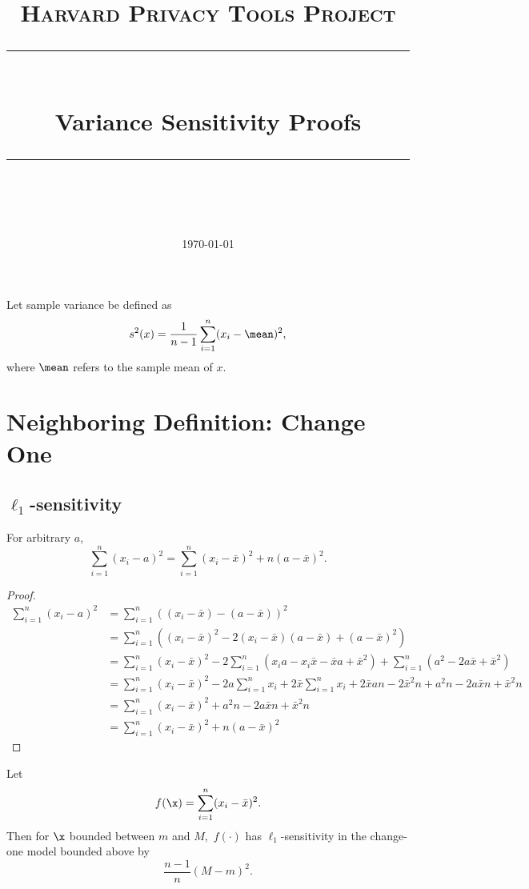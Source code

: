 \documentclass[11pt]{scrartcl} %
\title{
	\normalfont\normalsize
	\textsc{Harvard Privacy Tools Project}\\ %
	\vspace{25pt} %
	\rule{\linewidth}{0.5pt}\\ %
	\vspace{20pt} %
	{\huge Variance Sensitivity Proofs}\\ %
	\vspace{12pt} %
	\rule{\linewidth}{2pt}\\ %
	\vspace{12pt} %
}
\date{\normalsize\today} %
\begin{document}
\maketitle

\begin{definition}
Let sample variance be defined as
$$ s^2(x) = \frac{1}{n-1} \sum_{i=1}^n (x_i - \mean)^2,$$
where $\mean$ refers to the sample mean of $x$.
\end{definition}

\section{Neighboring Definition: Change One}
\subsection{$\ell_1$-sensitivity}
\begin{lemma}
\label{lemma:meansum}
For arbitrary $a$,
$$ \sum_{i=1}^n (x_i - a)^2 = \sum_{i=1}^n (x_i - \bar{x})^2 + n(a-\bar{x})^2.$$
\end{lemma}

\begin{proof}
\begin{align*}
\sum_{i=1}^n (x_i - a)^2 &= \sum_{i=1}^n \left( (x_i - \bar{x}) - (a-\bar{x}) \right)^2\\
	&= \sum_{i=1}^n \left( (x_i - \bar{x})^2 -2(x_i - \bar{x})(a-\bar{x}) + (a-\bar{x})^2\right)\\
	&= \sum_{i=1}^n (x_i - \bar{x})^2 - 2\sum_{i=1}^n \left(x_ia-x_i\bar{x} -\bar{x}a + \bar{x}^2\right) + \sum_{i=1}^n \left( a^2 -2a\bar{x} + \bar{x}^2\right)\\
	&=  \sum_{i=1}^n (x_i - \bar{x})^2 -2a\sum_{i=1}^n x_i + 2\bar{x}\sum_{i=1}^n x_i + 2\bar{x}an - 2\bar{x}^2n + a^2n-2a\bar{x}n+\bar{x}^2n\\
	&=  \sum_{i=1}^n (x_i - \bar{x})^2 + a^2n-2a\bar{x}n+\bar{x}^2n\\
	&=  \sum_{i=1}^n (x_i - \bar{x})^2 + n(a-\bar{x})^2
\end{align*}

\end{proof}

\begin{theorem}
\label{thm:l1change}
Let
$$ f(\x) = \sum_{i=1}^n (x_i - \bar{x})^2.$$
Then for $\x$ bounded between $m$ and $M,$ $f(\cdot)$ has $\ell_1$-sensitivity in the change-one model bounded above by
$$\frac{n-1}{n} (M-m)^2.$$
\end{theorem}
\end{document}
